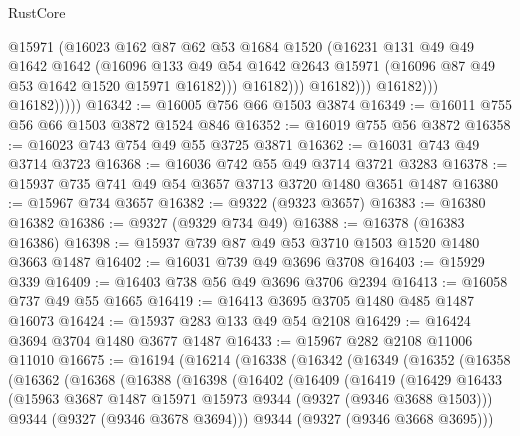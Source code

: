 \begin{lexlean}{RustCore}
\begin{coremodule}
                              @15971
                              (@16023
                                @162
                                @87
                                @62
                                @53
                                @1684
                                @1520
                                (@16231
                                  @131
                                  @49
                                  @49
                                  @1642
                                  @1642
                                  (@16096
                                    @133
                                    @49
                                    @54
                                    @1642
                                    @2643
                                    @15971
                                    (@16096 @87 @49 @53 @1642 @1520 @15971 @16182)))
                                @16182)))
                          @16182)))
                    @16182)))
              @16182)))))
@16342 := @16005 @756 @66 @1503 @3874
@16349 := @16011 @755 @56 @66 @1503 @3872 @1524 @846
@16352 := @16019 @755 @56 @3872
@16358 := @16023 @743 @754 @49 @55 @3725 @3871
@16362 := @16031 @743 @49 @3714 @3723
@16368 := @16036 @742 @55 @49 @3714 @3721 @3283
@16378 := @15937 @735 @741 @49 @54 @3657 @3713 @3720 @1480 @3651 @1487
@16380 := @15967 @734 @3657
@16382 := @9322 (@9323 @3657)
@16383 := @16380 @16382
@16386 := @9327 (@9329 @734 @49)
@16388 := @16378 (@16383 @16386)
@16398 := @15937 @739 @87 @49 @53 @3710 @1503 @1520 @1480 @3663 @1487
@16402 := @16031 @739 @49 @3696 @3708
@16403 := @15929 @339
@16409 := @16403 @738 @56 @49 @3696 @3706 @2394
@16413 := @16058 @737 @49 @55 @1665
@16419 := @16413 @3695 @3705 @1480 @485 @1487 @16073
@16424 := @15937 @283 @133 @49 @54 @2108
@16429 := @16424 @3694 @3704 @1480 @3677 @1487
@16433 := @15967 @282 @2108 @11006 @11010
@16675 := @16194
    (@16214
      (@16338
        (@16342
          (@16349
            (@16352
              (@16358
                (@16362
                  (@16368
                    (@16388
                      (@16398
                        (@16402
                          (@16409
                            (@16419
                              (@16429
                                @16433
                                (@15963 @3687 @1487 @15971 @15973 @9344 (@9327 (@9346 @3688 @1503)))
                                @9344
                                (@9327 (@9346 @3678 @3694)))
                              @9344
                              (@9327 (@9346 @3668 @3695)))

\end{coremodule}
\end{lexlean}
